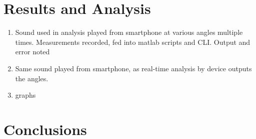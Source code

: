\documentclass[a4paper]{article}
\begin{document}
\section{Results and Analysis}
\begin{enumerate}

    \item Sound used in analysis played from smartphone at various angles multiple times. Measurements recorded, fed into matlab scripts and CLI. Output and error noted
    \item Same sound played from smartphone, as real-time analysis by device outputs the angles.
    \item graphs
\end{enumerate}




\section{Conclusions}




\end{document}
